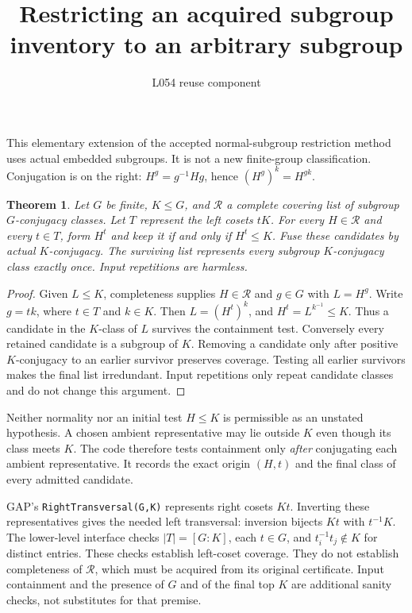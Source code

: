 \documentclass[11pt]{article}
\title{Restricting an acquired subgroup inventory to an arbitrary subgroup}
\author{L054 reuse component}\date{}
\newtheorem{theorem}{Theorem}\newtheorem{corollary}[theorem]{Corollary}
\begin{document}
\maketitle
This elementary extension of the accepted normal-subgroup restriction method
uses actual embedded subgroups. It is not a new finite-group classification.
Conjugation is on the right: $H^g=g^{-1}Hg$, hence $(H^g)^k=H^{gk}$.

\begin{theorem}
Let $G$ be finite, $K\leq G$, and $\mathcal R$ a complete covering list of
subgroup $G$-conjugacy classes. Let $T$ represent the left cosets $tK$.
For every $H\in\mathcal R$ and every $t\in T$, form $H^t$ and keep it
if and only if $H^t\leq K$. Fuse these candidates by actual $K$-conjugacy.
The surviving list represents every subgroup $K$-conjugacy class exactly once.
Input repetitions are harmless.
\end{theorem}
\begin{proof}
Given $L\leq K$, completeness supplies $H\in\mathcal R$ and $g\in G$
with $L=H^g$. Write $g=tk$, where $t\in T$ and $k\in K$. Then
$L=(H^t)^k$, and $H^t=L^{k^{-1}}\leq K$. Thus a candidate in the
$K$-class of $L$ survives the containment test. Conversely every retained
candidate is a subgroup of $K$. Removing a candidate only after positive
$K$-conjugacy to an earlier survivor preserves coverage. Testing all earlier
survivors makes the final list irredundant. Input repetitions only repeat
candidate classes and do not change this argument.
\end{proof}

Neither normality nor an initial test $H\leq K$ is permissible as an
unstated hypothesis. A chosen ambient representative may lie outside $K$
even though its class meets $K$. The code therefore tests containment only
\emph{after} conjugating each ambient representative. It records the exact
origin $(H,t)$ and the final class of every admitted candidate.

GAP's \texttt{RightTransversal(G,K)} represents right cosets $Kt$.
Inverting these representatives gives the needed left transversal: inversion
bijects $Kt$ with $t^{-1}K$. The lower-level interface checks $|T|=[G:K]$,
each $t\in G$, and $t_i^{-1}t_j\notin K$ for distinct entries. These
checks establish left-coset coverage. They do not establish completeness of
$\mathcal R$, which must be acquired from its original certificate.
Input containment and the presence of $G$ and of the final top $K$ are
additional sanity checks, not substitutes for that premise.
\end{document}
